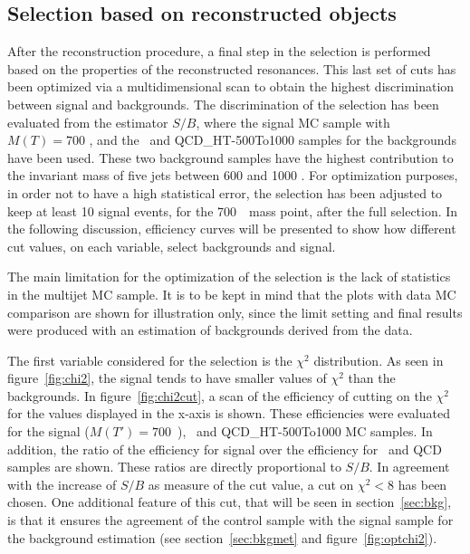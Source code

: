\subsection{Selection based on reconstructed objects}
\label{sec:finalsel}

After the reconstruction procedure, a final step in the selection is performed based on the properties of the reconstructed resonances. This last set of cuts has been optimized via a multidimensional scan to obtain the highest discrimination between signal and backgrounds. The discrimination of the selection has been evaluated from the estimator $S/B$, where the signal MC sample with $M(T)=700$ \GeVcc, and the \ttbar~and QCD\_HT-500To1000 samples for the backgrounds have been used. These two background samples have the highest contribution to the invariant mass of five jets between 600 and 1000 \GeVcc. For optimization purposes, in order not to have a high statistical error, the selection has been adjusted to keep at least 10 signal events, for the 700~\GeVcc~mass point, after the full selection. In the following discussion, efficiency curves will be presented to show how different cut values, on each variable, select backgrounds and signal. 

The main limitation for the optimization of the selection is the lack of statistics in the multijet MC sample. It is to be kept in mind that the plots with data MC comparison are shown for illustration only, since the limit setting and final results were produced with an estimation of backgrounds derived from the data.

The first variable considered for the selection is the $\chi^{2}$ distribution. As seen in figure~\ref{fig:chi2}, the signal tends to have smaller values of $\chi^{2}$ than the backgrounds. In figure~\ref{fig:chi2cut}, a scan of the efficiency of cutting on the $\chi^{2}$ for the values displayed in the x-axis is shown. These efficiencies were evaluated for the signal (${M(T')=700}$~\GeVcc), \ttbar~and QCD\_HT-500To1000 MC samples. In addition, the ratio of the efficiency for signal over the efficiency for \ttbar~and QCD samples are shown. These ratios are directly proportional to $S/B$. In agreement with the increase of $S/B$ as measure of the cut value, a cut on $\chi^{2}<8$ has been chosen. One additional feature of this cut, that will be seen in section~\ref{sec:bkg}, is that it ensures the agreement of the control sample with the signal sample for the background estimation (see section~\ref{sec:bkgmet} and figure~\ref{fig:optchi2}).

